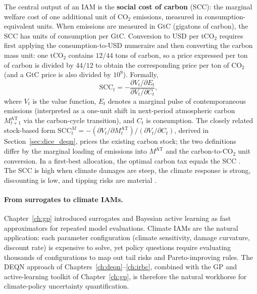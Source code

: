 \documentclass[11pt,a4paper]{report}
\begin{document}
The central output of an IAM is the \textbf{social cost of carbon} (SCC): the marginal welfare cost of one additional unit of CO$_2$ emissions, measured in consumption-equivalent units.  When emissions are measured in GtC (gigatons of carbon), the SCC has units of consumption per GtC.  Conversion to USD per tCO$_2$ requires first applying the consumption-to-USD numeraire and then converting the carbon mass unit: one tCO$_2$ contains $12/44$ tons of carbon, so a price expressed per ton of carbon is divided by $44/12$ to obtain the corresponding price per ton of CO$_2$ (and a GtC price is also divided by $10^9$).  Formally,
\begin{equation}
\mathrm{SCC}_t = -\frac{\partial V_t / \partial E_t}{\partial V_t / \partial C_t},
\label{eq:scc}
\end{equation}
where $V_t$ is the value function, $E_t$ denotes a marginal pulse of contemporaneous emissions (interpreted as a one-unit shift in next-period atmospheric carbon $M^{\mathrm{AT}}_{t+1}$ via the carbon-cycle transition), and $C_t$ is consumption.  The closely related stock-based form $\mathrm{SCC}^M_t = -(\partial V_t/\partial M^{\mathrm{AT}}_t)/(\partial V_t/\partial C_t)$, derived in Section~\ref{sec:dice_deqn}, prices the existing carbon stock; the two definitions differ by the marginal loading of emissions into $M^{\mathrm{AT}}$ and the carbon-to-CO$_2$ unit conversion.  In a first-best allocation, the optimal carbon tax equals the SCC \citep{golosov2014optimal}.  The SCC is high when climate damages are steep, the climate response is strong, discounting is low, and tipping risks are material \citep{caiSocialCostCarbon2019, DIETZ20241}.

\paragraph{From surrogates to climate IAMs.}
Chapter~\ref{ch:gp} introduced surrogates and Bayesian active learning as fast approximators for repeated model evaluations.  Climate IAMs are the natural application: each parameter configuration (climate sensitivity, damage curvature, discount rate) is expensive to solve, yet policy questions require evaluating thousands of configurations to map out tail risks and Pareto-improving rules.  The DEQN approach of Chapters~\ref{ch:deqn}--\ref{ch:irbc}, combined with the GP and active-learning toolkit of Chapter~\ref{ch:gp}, is therefore the natural workhorse for climate-policy uncertainty quantification.
\end{document}
